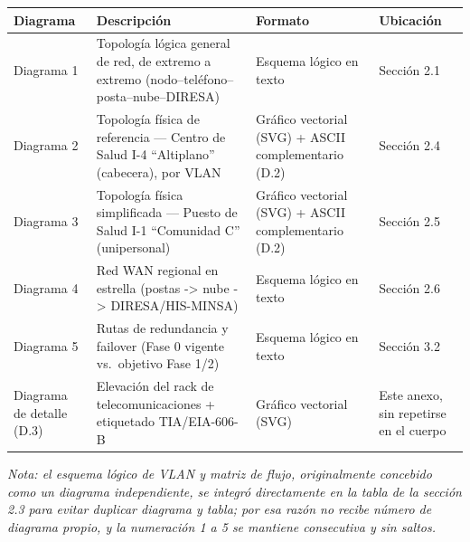 \documentclass[11pt,a4paper]{article}
\begin{document}
{\small
\begin{longtable}[]{@{}
  >{\raggedright\arraybackslash}p{}
  >{\raggedright\arraybackslash}p{}
  >{\raggedright\arraybackslash}p{}
  >{\raggedright\arraybackslash}p{}@{}}
\toprule\noalign{}
\begin{minipage}[b]{\linewidth}\raggedright
Diagrama
\end{minipage} & \begin{minipage}[b]{\linewidth}\raggedright
Descripción
\end{minipage} & \begin{minipage}[b]{\linewidth}\raggedright
Formato
\end{minipage} & \begin{minipage}[b]{\linewidth}\raggedright
Ubicación
\end{minipage} \\
\midrule\noalign{}
\endhead
\bottomrule\noalign{}
\endlastfoot
Diagrama 1 & Topología lógica general de red, de extremo a extremo (nodo--teléfono--posta--nube--DIRESA) & Esquema lógico en texto & Sección 2.1 \\
Diagrama 2 & Topología física de referencia --- Centro de Salud I-4 ``Altiplano'' (cabecera), por VLAN & Gráfico vectorial (SVG) + ASCII complementario (D.2) & Sección 2.4 \\
Diagrama 3 & Topología física simplificada --- Puesto de Salud I-1 ``Comunidad C'' (unipersonal) & Gráfico vectorial (SVG) + ASCII complementario (D.2) & Sección 2.5 \\
Diagrama 4 & Red WAN regional en estrella (postas -\textgreater{} nube -\textgreater{} DIRESA/HIS-MINSA) & Esquema lógico en texto & Sección 2.6 \\
Diagrama 5 & Rutas de redundancia y failover (Fase 0 vigente vs.~objetivo Fase 1/2) & Esquema lógico en texto & Sección 3.2 \\
Diagrama de detalle (D.3) & Elevación del rack de telecomunicaciones + etiquetado TIA/EIA-606-B & Gráfico vectorial (SVG) & Este anexo, sin repetirse en el cuerpo \\
\end{longtable}
}

\emph{Nota: el esquema lógico de VLAN y matriz de flujo, originalmente concebido como un diagrama independiente, se integró directamente en la tabla de la sección 2.3 para evitar duplicar diagrama y tabla; por esa razón no recibe número de diagrama propio, y la numeración 1 a 5 se mantiene consecutiva y sin saltos.}
\end{document}
